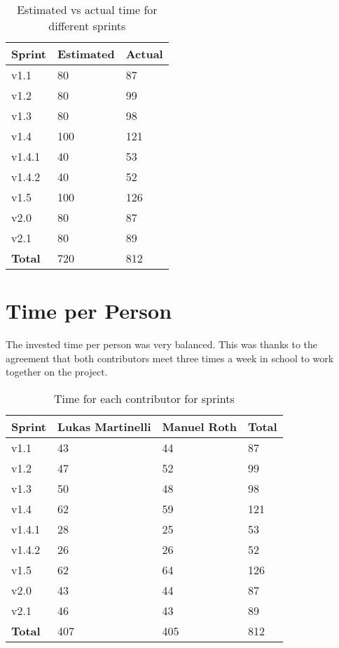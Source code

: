 \begin{table}[H]
\centering
    \begin{tabular}{lll}
    \textbf{Sprint}        & \textbf{Estimated} & \textbf{Actual} \\
     \hline
    v1.1    & 80     & 87        \\
    v1.2    & 80     & 99        \\
    v1.3    & 80     & 98        \\
    v1.4    & 100    & 121       \\
    v1.4.1  & 40     & 53       \\
    v1.4.2  & 40     & 52       \\
    v1.5    & 100    & 126       \\
    v2.0    & 80     & 87        \\
    v2.1    & 80     & 89        \\
    \hline
    \textbf{Total} & 720 & 812   \\
    \end{tabular}
    \caption{Estimated vs actual time for different sprints}
\end{table}
\newpage

\section{Time per Person}

The invested time per person was very balanced. This was thanks to the agreement that both contributors meet three times a week in school to work together on the project. 

\begin{table}[H]
\centering
    \begin{tabular}{llll}
    \textbf{Sprint}  & \textbf{Lukas Martinelli} & \textbf{Manuel Roth} & \textbf{Total} \\
    \hline
    v1.1    & 43               & 44          & 87    \\
    v1.2    & 47               & 52          & 99    \\
    v1.3    & 50               & 48          & 98    \\
    v1.4    & 62               & 59          & 121   \\
    v1.4.1  & 28               & 25          & 53   \\
    v1.4.2  & 26               & 26          & 52   \\
    v1.5    & 62               & 64          & 126   \\
    v2.0    & 43               & 44          & 87    \\
    v2.1    & 46               & 43          & 89    \\
    \hline
    \textbf{Total}          & 407              & 405         & 812   \\
    \end{tabular}
    \caption{Time for each contributor for sprints}
\end{table}